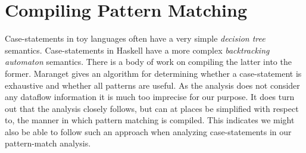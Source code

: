 \section{Compiling Pattern Matching}
Case-statements in toy languages often have a very simple \emph{decision tree} semantics. Case-statements in Haskell have a more complex \emph{backtracking automaton} semantics. There is a body of work on compiling the latter into the former. Maranget \cite{DBLP:journals/jfp/Maranget07} gives an algorithm for determining whether a case-statement is exhaustive and whether all patterns are useful. As the analysis does not consider any dataflow information it is much too imprecise for our purpose. It does turn out that the analysis closely follows, but can at places be simplified with respect to, the manner in which pattern matching is compiled. This indicates we might also be able to follow such an approach when analyzing case-statements in our pattern-match analysis.
